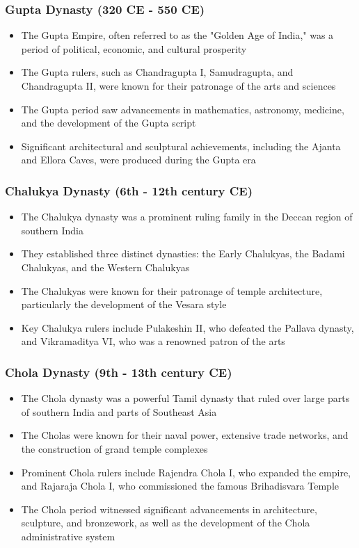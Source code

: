 \begin{frame}[fragile]\frametitle{Gupta Dynasty (320 CE - 550 CE)}
    \begin{itemize}
        \item The Gupta Empire, often referred to as the "Golden Age of India," was a period of political, economic, and cultural prosperity
        \item The Gupta rulers, such as Chandragupta I, Samudragupta, and Chandragupta II, were known for their patronage of the arts and sciences
        \item The Gupta period saw advancements in mathematics, astronomy, medicine, and the development of the Gupta script
        \item Significant architectural and sculptural achievements, including the Ajanta and Ellora Caves, were produced during the Gupta era
    \end{itemize}
\end{frame}

\begin{frame}[fragile]\frametitle{Chalukya Dynasty (6th - 12th century CE)}
    \begin{itemize}
        \item The Chalukya dynasty was a prominent ruling family in the Deccan region of southern India
        \item They established three distinct dynasties: the Early Chalukyas, the Badami Chalukyas, and the Western Chalukyas
        \item The Chalukyas were known for their patronage of temple architecture, particularly the development of the Vesara style
        \item Key Chalukya rulers include Pulakeshin II, who defeated the Pallava dynasty, and Vikramaditya VI, who was a renowned patron of the arts
    \end{itemize}
\end{frame}

\begin{frame}[fragile]\frametitle{Chola Dynasty (9th - 13th century CE)}
    \begin{itemize}
        \item The Chola dynasty was a powerful Tamil dynasty that ruled over large parts of southern India and parts of Southeast Asia
        \item The Cholas were known for their naval power, extensive trade networks, and the construction of grand temple complexes
        \item Prominent Chola rulers include Rajendra Chola I, who expanded the empire, and Rajaraja Chola I, who commissioned the famous Brihadisvara Temple
        \item The Chola period witnessed significant advancements in architecture, sculpture, and bronzework, as well as the development of the Chola administrative system
    \end{itemize}
\end{frame}

